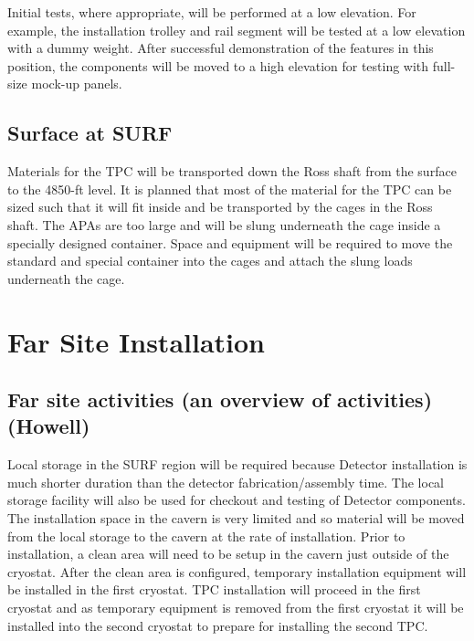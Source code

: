 Initial tests, where appropriate, will be performed at a low elevation. For example, the installation trolley 
and rail segment will be tested at a low elevation with a dummy weight. After successful demonstration of the features in this position, the components will be moved to a high elevation for testing with full-
size mock-up panels. 

\subsection{Surface at SURF}
\label{fd:install:tempeqp:surfsurface}

Materials for the TPC will be transported down the Ross shaft from the surface to the 4850-ft level.  It is planned that most of the material for the TPC can be sized such that it will fit inside and be transported by the cages in the Ross shaft.  The APAs are too large and will be slung underneath the cage inside a specially designed container.  Space and equipment will be required to move the standard and special container into the cages and attach the slung loads underneath the cage.  

\section{Far Site Installation}
\label{fd:install:fsinstall}

\subsection{Far site activities (an overview of activities) (Howell)}
\label{fd:install:fsactivities}

Local storage in the SURF region will be required because Detector installation is much shorter duration than the detector fabrication/assembly time. The local storage facility will also be used for checkout and 
testing of Detector components. The installation space in the cavern is very limited and so material will be moved from the local storage to the cavern at the rate of installation. Prior to installation, a clean area 
will need to be setup in the cavern just outside of the cryostat. After the clean area is configured, temporary installation equipment will be installed in the first cryostat. TPC installation will proceed in the 
first cryostat and as temporary equipment is removed from the first cryostat it will be installed into the second cryostat to prepare for installing the second TPC.

